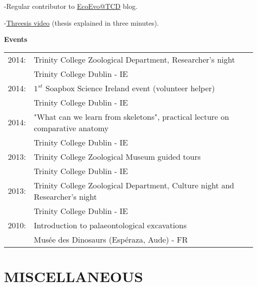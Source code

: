 \documentclass[10pt,a4paper]{article}
\begin{document}
{-Regular contributor to \href{http://www.ecoevoblog.com/}{EcoEvo@TCD} blog.

-\href{http://www.youtube.com/watch?v=Y3ciaYSvbyU}{Threesis video} (thesis explained in three minutes).
\bigskip

\raggedright\textbf{Events}\\[1.5ex]
\begin{tabular}{ll}
2014: & Trinity College Zoological Department, Researcher's night\\
& Trinity College Dublin - IE\\
2014: & $1^{st}$ Soapbox Science Ireland event (volunteer helper)\\
& Trinity College Dublin - IE\\
2014: & "What can we learn from skeletons", practical lecture on comparative anatomy \\
& Trinity College Dublin - IE \\
2013: & Trinity College Zoological Museum guided tours\\
& Trinity College Dublin - IE\\
2013: & Trinity College Zoological Department, Culture night and Researcher's night\\
& Trinity College Dublin - IE\\
2010: & Introduction to palaeontological excavations\\
& Mus\'{e}e des Dinosaurs (Esp\'{e}raza, Aude) - FR\\
\end{tabular}
\bigskip

\section{MISCELLANEOUS}
\bigskip

}
\end{document}
